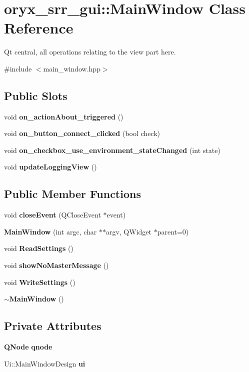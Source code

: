 \section{oryx\-\_\-srr\-\_\-gui\-:\-:\-Main\-Window \-Class \-Reference}
\label{classoryx__srr__gui_1_1MainWindow}


\-Qt central, all operations relating to the view part here.  




{\ttfamily \#include $<$main\-\_\-window.\-hpp$>$}

\subsection*{\-Public \-Slots}
\begin{DoxyCompactItemize}
\item 
void {\bf on\-\_\-action\-About\-\_\-triggered} ()
\item 
void {\bf on\-\_\-button\-\_\-connect\-\_\-clicked} (bool check)
\item 
void {\bf on\-\_\-checkbox\-\_\-use\-\_\-environment\-\_\-state\-Changed} (int state)
\item 
void {\bf update\-Logging\-View} ()
\end{DoxyCompactItemize}
\subsection*{\-Public \-Member \-Functions}
\begin{DoxyCompactItemize}
\item 
void {\bf close\-Event} (\-Q\-Close\-Event $\ast$event)
\item 
{\bf \-Main\-Window} (int argc, char $\ast$$\ast$argv, \-Q\-Widget $\ast$parent=0)
\item 
void {\bf \-Read\-Settings} ()
\item 
void {\bf show\-No\-Master\-Message} ()
\item 
void {\bf \-Write\-Settings} ()
\item 
{\bf $\sim$\-Main\-Window} ()
\end{DoxyCompactItemize}
\subsection*{\-Private \-Attributes}
\begin{DoxyCompactItemize}
\item 
{\bf \-Q\-Node} {\bf qnode}
\item 
\-Ui\-::\-Main\-Window\-Design {\bf ui}
\end{DoxyCompactItemize}



